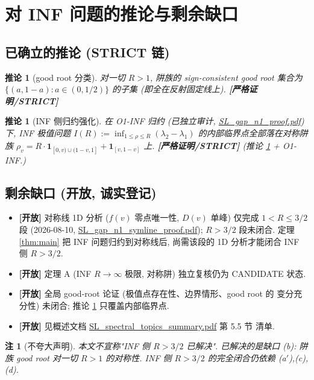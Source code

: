 \documentclass[UTF8]{ctexart}
\newtheorem{corollary}[theorem]{推论}
\newtheorem{remark}[theorem]{注}
\newcommand{\STRICT}{\textbf{[严格证明/STRICT]}}
\newcommand{\OPEN}{\textbf{[开放]}}
\begin{document}
\section{对 INF 问题的推论与剩余缺口}\label{sec:gaps}

\subsection{已确立的推论 (STRICT 链)}

\begin{corollary}[good root 分类]\label{cor:class}
	对一切 $R>1$, 阱族的 sign-consistent good root 集合为
	$\{(a,1-a):a\in(0,1/2)\}$ 的子集 (即全在反射固定线上). \STRICT{}
\end{corollary}

\begin{corollary}[INF 侧归约强化]\label{cor:reduction}
	在 O1-INF 归约 (已独立审计, \url{SL\_gap\_n1\_proof.pdf}) 下, INF 极值问题
	$I(R):=\inf_{1\le\rho\le R}(\lambda_2-\lambda_1)$ 的内部临界点全部落在对称阱族
	$\rho_v=R\cdot\mathbf1_{[0,v)\cup(1-v,1]}+\mathbf1_{[v,1-v]}$ 上.
	\STRICT{} (推论 \ref{cor:class} + O1-INF.)
\end{corollary}

\subsection{剩余缺口 (开放, 诚实登记)}\label{sec:gaps-open}

\begin{itemize}
	\item[(a$'$)] \OPEN{} 对称线 1D 分析 ($f(v)$ 零点唯一性, $D(v)$ 单峰) 仅完成
		$1<R\le3/2$ 段 (2026-08-10, \url{SL\_gap\_n1\_symline\_proof.pdf});
		$R>3/2$ 段未闭合. 定理 \ref{thm:main} 把 INF 问题归约到对称线后,
		尚需该段的 1D 分析才能闭合 INF 侧 $R>3/2$.
	\item[(c)] \OPEN{} 定理 A (INF $R\to\infty$ 极限, 对称阱) 独立复核仍为
		CANDIDATE 状态.
	\item[(d)] \OPEN{} 全局 good-root 论证 (极值点存在性、边界情形、good root 的
		变分充分性) 未闭合; 推论 \ref{cor:reduction} 只覆盖内部临界点.
	\item[其他] \OPEN{} 见概述文档 \url{SL\_spectral\_topics\_summary.pdf} 第 5.5 节
		清单.
\end{itemize}

\begin{remark}[不夸大声明]
	本文\emph{不}宣称"INF 侧 $R>3/2$ 已解决". 已解决的是缺口 (b):
	阱族 good root 对一切 $R>1$ 的对称性. INF 侧 $R>3/2$ 的完全闭合仍依赖
	(a$'$),(c),(d).
\end{remark}
\end{document}
